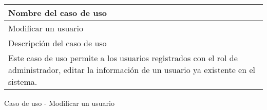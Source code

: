 \begin{identificacionCasoDeUso}
	\begin{tabular} { | p{17cm} |}

		\hline
		Nombre del caso de uso                                                                                                                           \\ \hline
		Modificar un usuario                                                                                                                             \\ \hline
		Descripción del caso de uso                                                                                                                      \\ \hline
		Este caso de uso permite a los usuarios registrados con el rol de administrador, editar la información de un usuario ya existente en el sistema. \\ \hline
	\end{tabular}
	\caption{Caso de uso - Modificar un usuario}
\end{identificacionCasoDeUso}